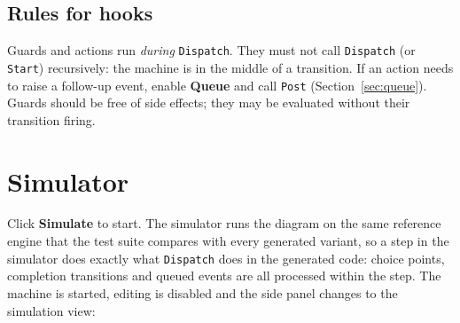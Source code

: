 \documentclass[11pt,a4paper,openany]{report}
\newcommand{\ui}[1]{\textsf{\textbf{#1}}}
\newcommand{\code}[1]{\texttt{#1}}
\begin{document}
\section{Rules for hooks}
Guards and actions run \emph{during} \code{Dispatch}. They must not call \code{Dispatch} (or
\code{Start}) recursively: the machine is in the middle of a transition. If an action needs to raise a
follow-up event, enable \ui{Queue} and call \code{Post} (Section~\ref{sec:queue}).
Guards should be free of side effects; they may be evaluated without their transition firing.

\chapter{Simulator}
\label{ch:sim}

Click \ui{Simulate} to start. The simulator runs the diagram on the same reference engine that the
test suite compares with every generated variant, so a step in the simulator does exactly what
\code{Dispatch} does in the generated code: choice points, completion transitions and queued events
are all processed within the step. The machine is started, editing is disabled and the side panel
changes to the simulation view:
\end{document}
